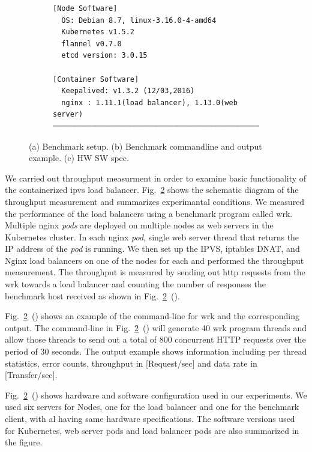 \begin{figure}[tb]
\begin{subfigure}[t]{\columnwidth}
\begin{Verbatim}[commandchars=\\\{\}]
[Node Software]
  OS: Debian 8.7, linux-3.16.0-4-amd64
  Kubernetes v1.5.2
  flannel v0.7.0
  etcd version: 3.0.15

[Container Software]
  Keepalived: v1.3.2 (12/03,2016)
  nginx : 1.11.1(load balancer), 1.13.0(web server) 
───────────────────────────────────────────────────────
\end{Verbatim}
    \caption{}
    \label{fig:hw_sw_spec}
  \end{subfigure}

  \caption{
    (a) Benchmark setup. (b) Benchmark commandline and output example. (c) HW SW spec.
  }
  \label{fig:benchmark-schem}
\end{figure}

We carried out throughput measurment in order to examine basic functionality of the containerized ipvs load balancer.
Fig.~\ref{fig:benchmark-schem} shows the schematic diagram of the throughput measurement and summarizes experimantal conditions.
We measured the performance of the load balancers using a benchmark program called wrk\cite{Glozer2016}.
Multiple nginx {\em pods} are deployed on multiple nodes as web servers in the Kubernetes cluster. 
In each nginx {\em pod}, single web server thread that returns the IP address of the {\em pod} is running.
We then set up the IPVS, iptables DNAT, and Nginx load balancers on one of the nodes for each and performed the throughput measurement.
The throughput is measured by sending out http requests from the wrk towards a load balancer and counting the number of responses the benchmark host received as shown in Fig.~\ref{fig:benchmark-schem}~().

Fig.~\ref{fig:benchmark-schem}~() shows an example of the command-line for wrk and the corresponding output.
The command-line in Fig.~\ref{fig:benchmark-schem}~() will generate 40 wrk program threads 
and allow those threads to send out a total of 800 concurrent HTTP requests over the period of 30 seconds.
The output example shows information including per thread statistics, error counts, throughput in [Request/sec] and data rate in [Transfer/sec].

Fig.~\ref{fig:benchmark-schem}~() shows hardware and software configuration used in our experiments.
We used six servers for Nodes, one for the load balancer and one for the benchmark client, with al having same hardware specifications.
The software versions used for Kubernetes, web server pods and load balancer pods are also summarized in the figure.


